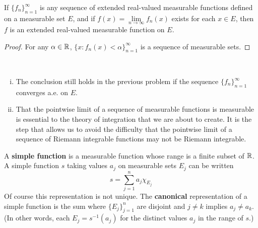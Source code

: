 \begin{pblm}\label{p:ext_real_val_seq}%
	If $\{f_n\}_{n=1}^\infty$ is any sequence of extended real-valued 
	measurable functions defined on a measurable set $E$, and if $f(x) = 
	\lim\limits_{n\to\infty}f_n(x)$ exists for each $x \in E$, then $f$ is an 
	extended real-valued measurable function on $E$. 
\begin{proof}
	For any $\alpha \in \mathbb{R}$, $\{x: f_n(x) < \alpha\}_{n=1}^\infty$ is a sequence of 
	measurable sets. 
\end{proof}
\end{pblm}

\begin{rmk}%
	~
	\begin{enumerate}[(i)]
	\item The conclusion still holds in the previous problem if the sequence 
	$\{f_n\}_{n=1}^\infty$ converges a.e. on $E$. 
	\item That the pointwise limit of a sequence of measurable functions is 
	measurable is essential to the theory of integration that we are about to 
	create. It is the step that allows us to avoid the difficulty that the 
	pointwise limit of a sequence of Riemann integrable functions may not be 
	Riemann integrable. 
	\end{enumerate}
\end{rmk}

\begin{defn}\label{d:simplefunction}%
	A \textbf{simple function} is a measurable function whose range is a finite 
	subset of $\mathbb{R}$. A simple function $s$ taking values $a_j$ on measurable 
	sets $E_j$ can be written 
	\begin{equation*}
		s = \sum\limits_{j=1}^n a_j \chi_{E_j}
	\end{equation*}
	Of course this representation is not unique. The \textbf{canonical} 
	representation of a simple function is the sum where $\{E_j\}_{j=1}^n$ 
	are disjoint and $j \neq k$ implies $a_j \neq a_k$. (In other words, each 
	$E_j = s^{-1} (a_j)$ for the distinct values $a_j$ in the range of $s$.)
\end{defn}


